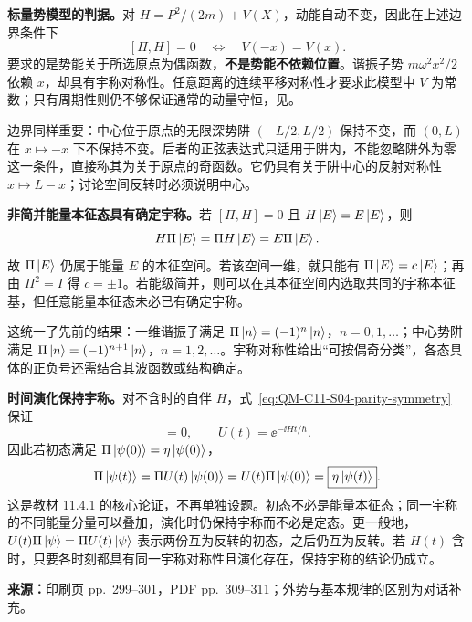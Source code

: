 \textbf{标量势模型的判据。}对 $H=P^2/(2m)+V(X)$，动能自动不变，因此在上述边界条件下
\begin{equation}
  \boxed{[\Pi,H]=0\quad\Longleftrightarrow\quad V(-x)=V(x)}.
\end{equation}
要求的是势能关于所选原点为偶函数，\textbf{不是势能不依赖位置}。谐振子势 $m\omega^2x^2/2$ 依赖 $x$，却具有宇称对称性。任意距离的连续平移对称性才要求此模型中 $V$ 为常数；只有周期性则仍不够保证通常的动量守恒，见。

边界同样重要：中心位于原点的无限深势阱 $(-L/2,L/2)$ 保持不变，而 $(0,L)$ 在 $x\mapsto-x$ 下不保持不变。后者的正弦表达式只适用于阱内，不能忽略阱外为零这一条件，直接称其为关于原点的奇函数。它仍具有关于阱中心的反射对称性 $x\mapsto L-x$；讨论空间反转时必须说明中心。

\textbf{非简并能量本征态具有确定宇称。}若 $[\Pi,H]=0$ 且 $H\left|E\right\rangle=E\left|E\right\rangle$，则
\begin{equation}
  H\Pi\left|E\right\rangle=\Pi H\left|E\right\rangle=E\Pi\left|E\right\rangle.
\end{equation}
故 $\Pi\left|E\right\rangle$ 仍属于能量 $E$ 的本征空间。若该空间一维，就只能有 $\Pi\left|E\right\rangle=c\left|E\right\rangle$；再由 $\Pi^2=I$ 得 $c=\pm1$。若能级简并，则可以在其本征空间内选取共同的宇称本征基，但任意能量本征态未必已有确定宇称。

这统一了先前的结果：一维谐振子满足 $\Pi\left|n\right\rangle=(-1)^n\left|n\right\rangle$，$n=0,1,\ldots$；中心势阱满足 $\Pi\left|n\right\rangle=(-1)^{n+1}\left|n\right\rangle$，$n=1,2,\ldots$。宇称对称性给出“可按偶奇分类”，各态具体的正负号还需结合其波函数或结构确定。

\textbf{时间演化保持宇称。}对不含时的自伴 $H$，式~\eqref{eq:QM-C11-S04-parity-symmetry} 保证
\begin{equation}
  [\Pi,U(t)]=0,\qquad U(t)=\ee^{-\ii Ht/\hbar}.
\end{equation}
因此若初态满足 $\Pi\left|\psi(0)\right\rangle=\eta\left|\psi(0)\right\rangle$，
\begin{equation}
  \Pi\left|\psi(t)\right\rangle
    =\Pi U(t)\left|\psi(0)\right\rangle
    =U(t)\Pi\left|\psi(0)\right\rangle
    =\boxed{\eta\left|\psi(t)\right\rangle}.
\end{equation}
这是教材 11.4.1 的核心论证，不再单独设题。初态不必是能量本征态；同一宇称的不同能量分量可以叠加，演化时仍保持宇称而不必是定态。更一般地，$U(t)\Pi\left|\psi\right\rangle=\Pi U(t)\left|\psi\right\rangle$ 表示两份互为反转的初态，之后仍互为反转。若 $H(t)$ 含时，只要各时刻都具有同一宇称对称性且演化存在，保持宇称的结论仍成立。

\textbf{来源：}印刷页 pp.~299--301，PDF pp.~309--311；外势与基本规律的区别为对话补充。

